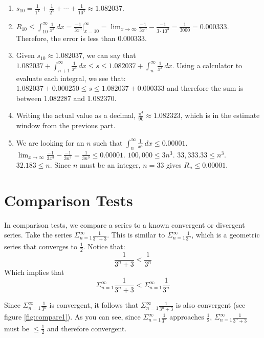 \begin{Answer}[ref=remainder1]
\begin{enumerate}
\item $s_{10} = \frac{1}{1^4} + \frac{1}{2^4} + \cdots + \frac{1}{10^4} \approx 
1.082037$. 
\item $R_{10} \leq \int_{10}^\infty \frac{1}{x^4}\,dx = \frac{-1}{3x^3}|_
{x=10}^\infty = \lim_{x \to \infty} \frac{-1}{3x^3} - \frac{-1}{3 \cdot 10^3} 
= \frac{1}{3000} = 0.000333$. Therefore, the error is less than 0.000333. 
\item Given $s_{10} \approx 1.082037$, we can say that $1.082037 + \int_{n+1}^
\infty \frac{1}{x^4}\,dx \leq s \leq 1.082037 + \int_{n}^{\infty} \frac{1}{x^4}
\,dx$. Using a calculator to evaluate each integral, we see that: $1.082037 + 
0.000250 \leq s \leq 1.082037 + 0.000333$ and therefore the sum is between 
1.082287 and 1.082370. 
\item Writing the actual value as a decimal, $\frac{\pi^4}{90} \approx 
1.082323$, which is in the estimate window from the previous part. 
\item We are looking for an $n$ such that $\int_n^\infty \frac{1}{x^4}\,dx 
\leq 0.00001$. $\lim_{x \to \infty} \frac{-1}{3x^3} - \frac{-1}{3n^3} = 
\frac{1}{3n^3} \leq 0.00001$. $100,000 \leq 3n^3$. $33,333.33 \leq n^3$. 
$32.183 \leq n$. Since $n$ must be an integer, $n=33$ gives $R_n \leq 0.00001$. 
\end{enumerate}
\end{Answer}

\section{Comparison Tests}
In comparison tests, we compare a series to a known convergent or divergent 
series. Take the series $\Sigma_{n=1}^\infty \frac{1}{3^n + 3}$. This is 
similar to $\Sigma_{n=1}^\infty \frac{1}{3^n}$, which is a geometric series 
that converges to $\frac{1}{2}$. Notice that:
$$\frac{1}{3^n + 3} < \frac{1}{3^n}$$
Which implies that 
$$\Sigma_{n=1}^\infty \frac{1}{3^n + 3} < \Sigma_{n=1}^\infty \frac{1}{3^n}$$

Since $\Sigma_{n=1}^\infty \frac{1}{3^n}$ is convergent, it follows that 
$\Sigma_{n=1}^\infty \frac{1}{3^n + 3}$ is also convergent (see figure 
\ref{fig:compare1}). As you can see, since  $\Sigma_{n=1}^\infty \frac{1}{3^n}$ 
approaches $\frac{1}{2}$, $\Sigma_{n=1}^\infty \frac{1}{3^n + 3}$ must be $\leq 
\frac{1}{2}$ and therefore convergent. 

